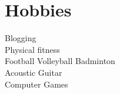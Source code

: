 \documentclass[]{deedy-resume-openfont}
\begin{document}
\begin{minipage}[t]{0.33\textwidth}

\section{Hobbies}
Blogging \\
Physical fitness \\
Football \textbullet{} Volleyball \textbullet{} Badminton \\
Acoustic Guitar \\
Computer Games \\
\sectionsep


%
%

\end{minipage} 
\hfill
\end{document}
